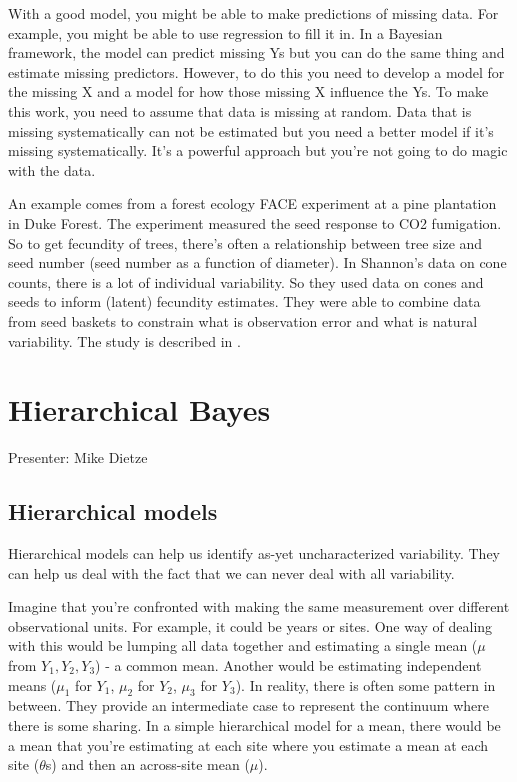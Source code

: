 \documentclass[12pt, oneside]{article}   	%
\begin{document}
With a good model, you might be able to make predictions of missing data. For example, you might be able to use regression to fill it in. In a Bayesian framework, the model can predict missing Ys but you can do the same thing and estimate missing predictors. However, to do this you need to develop a model for the missing X and a model for how those missing X influence the Ys. To make this work, you need to assume that data is missing at random. Data that is missing systematically can not be estimated but you need a better model if it's missing systematically. It's a powerful approach but you're not going to do magic with the data. 

An example comes from a forest ecology FACE experiment at a pine plantation in Duke Forest. The experiment measured the seed response to CO2 fumigation. So to get fecundity of trees, there's often a relationship between tree size and seed number (seed number as a function of diameter). In Shannon's data on cone counts, there is a lot of individual variability. So they used data on cones and seeds to inform (latent) fecundity estimates. They were able to combine data from seed baskets to constrain what is observation error and what is natural variability. The study is described in \cite{ladeau2006}.

\section{Hierarchical Bayes}

\noindent Presenter: Mike Dietze

\subsection{Hierarchical models}

Hierarchical models can help us identify as-yet uncharacterized variability. They can help us deal with the fact that we can never deal with all variability.

Imagine that you're confronted with making the same measurement over different observational units. For example, it could be years or sites. One way of dealing with this would be lumping all data together and estimating a single mean ($\mu$ from $Y_1, Y_2, Y_3$) - a common mean. Another would be estimating independent means ($\mu_1$ for $Y_1$, $\mu_2$ for $Y_2$, $\mu_3$ for $Y_3$). In reality, there is often some pattern in between. They provide an intermediate case to represent the continuum where there is some sharing. In a simple hierarchical model for a mean, there would be a mean that you're estimating at each site where you estimate a mean at each site ($\theta$s) and then an across-site mean ($\mu$). 
\end{document}

